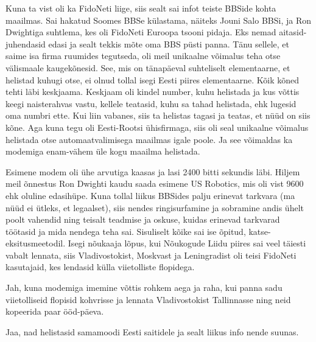 Kuna ta vist oli ka FidoNeti liige, siis sealt sai infot teiste BBSide 
kohta maailmas. Sai hakatud Soomes BBSe külastama, näiteks Jouni Salo 
BBSi, ja Ron Dwightiga suhtlema, kes oli FidoNeti Euroopa tsooni pidaja. Eks nemad aitasid-juhendasid edasi 
ja sealt tekkis mõte oma BBS püsti panna. Tänu sellele, et saime 
isa firma ruumides tegutseda, oli meil unikaalne võimalus teha otse välismaale 
kaugekõnesid. See, mis on tänapäeval suhteliselt elementaarne, et helistad kuhugi
otse, ei olnud tollal isegi Eesti piires elementaarne. Kõik kõned 
tehti läbi keskjaama. Keskjaam oli kindel number, kuhu helistada ja 
kus võttis keegi naisterahvas vastu, kellele teatasid, kuhu sa tahad 
helistada, ehk lugesid oma numbri ette. Kui liin vabanes, siis ta helistas 
tagasi ja teatas, et nüüd on siis kõne. Aga kuna tegu oli Eesti-Rootsi 
ühisfirmaga, siis oli seal unikaalne võimalus helistada otse automaatvalimisega maailmas igale poole. Ja see võimaldas ka modemiga enam-vähem 
üle kogu maailma helistada.


Esimene modem oli ühe arvutiga kaasas ja lasi 2400 bitti sekundis läbi. Hiljem meil õnnestus Ron Dwighti kaudu 
saada esimene US Robotics, mis oli vist 9600 ehk oluline edasihüpe. Kuna tollal liikus BBSides palju 
erinevat tarkvara (ma nüüd ei ütleks, et legaalset), siis nendes ringisurfamine ja sobramine andis ühelt poolt vahendid ning teisalt teadmise ja oskuse, 
kuidas erinevad tarkvarad töötasid ja mida nendega teha sai. 
Sisuliselt kõike sai ise õpitud, katse-eksitusmeetodil. Isegi nõukaaja lõpus, kui Nõukogude Liidu piires sai veel täiesti vabalt lennata, siis Vladivostokist, Moskvast ja Leningradist oli teisi FidoNeti 
kasutajaid, kes lendasid külla viietolliste flopidega.


Jah, kuna modemiga imemine võttis rohkem aega ja raha, kui panna
sadu viietolliseid flopisid kohvrisse ja lennata Vladivostokist 
Tallinnasse ning neid kopeerida paar ööd-päeva.


Jaa, nad helistasid samamoodi Eesti saitidele ja sealt liikus info nende 
suunas. 


